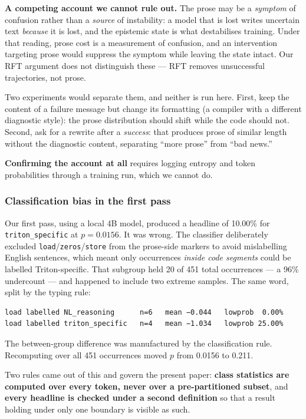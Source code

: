 \documentclass[
  11pt,
]{article}
\begin{document}
\textbf{A competing account we cannot rule out.} The prose may be a
\emph{symptom} of confusion rather than a \emph{source} of instability:
a model that is lost writes uncertain text \emph{because} it is lost,
and the epistemic state is what destabilises training. Under that
reading, prose cost is a measurement of confusion, and an intervention
targeting prose would suppress the symptom while leaving the state
intact. Our RFT argument does not distinguish these --- RFT removes
unsuccessful trajectories, not prose.

Two experiments would separate them, and neither is run here. First,
keep the content of a failure message but change its formatting (a
compiler with a different diagnostic style): the prose distribution
should shift while the code should not. Second, ask for a rewrite after
a \emph{success}: that produces prose of similar length without the
diagnostic content, separating ``more prose'' from ``bad news.''

\textbf{Confirming the account at all} requires logging entropy and
token probabilities through a training run, which we cannot do.

\hypertarget{classification-bias-in-the-first-pass}{%
\subsubsection{Classification bias in the first
pass}\label{classification-bias-in-the-first-pass}}

Our first pass, using a local 4B model, produced a headline of 10.00\%
for \texttt{triton\_specific} at \(p=0.0156\). It was wrong. The
classifier deliberately excluded
\texttt{load}/\texttt{zeros}/\texttt{store} from the prose-side markers
to avoid mislabelling English sentences, which meant only occurrences
\emph{inside code segments} could be labelled Triton-specific. That
subgroup held 20 of 451 total occurrences --- a 96\% undercount --- and
happened to include two extreme samples. The same word, split by the
typing rule:

\begin{verbatim}
load labelled NL_reasoning      n=6   mean −0.044   lowprob  0.00%
load labelled triton_specific   n=4   mean −1.034   lowprob 25.00%
\end{verbatim}

The between-group difference was manufactured by the classification
rule. Recomputing over all 451 occurrences moved \(p\) from 0.0156 to
0.211.

Two rules came out of this and govern the present paper: \textbf{class
statistics are computed over every token, never over a pre-partitioned
subset}, and \textbf{every headline is checked under a second
definition} so that a result holding under only one boundary is visible
as such.
\end{document}
